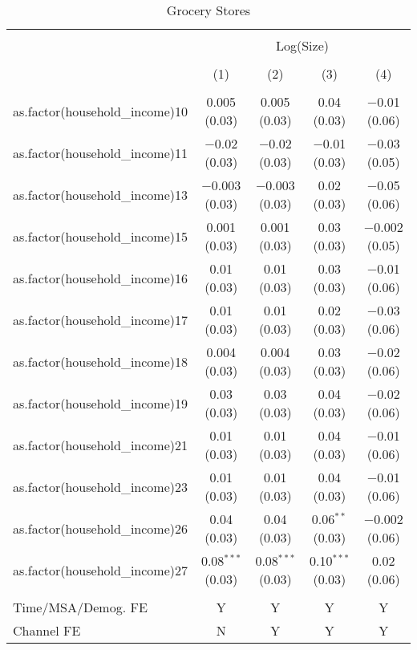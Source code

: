
\begin{table}[!htbp] \centering 
  \caption{Grocery Stores} 
  \label{tab:packageSizeGroceryTamponappendix} 
\begin{tabular}{@{\extracolsep{5pt}}lcccc} 
\\[-1.8ex]\hline 
\hline \\[-1.8ex] 
 & \multicolumn{4}{c}{Log(Size)} \\ 
\\[-1.8ex] & (1) & (2) & (3) & (4)\\ 
\hline \\[-1.8ex] 
 as.factor(household\_income)10 & 0.005 (0.03) & 0.005 (0.03) & 0.04 (0.03) & $-$0.01 (0.06) \\ 
  as.factor(household\_income)11 & $-$0.02 (0.03) & $-$0.02 (0.03) & $-$0.01 (0.03) & $-$0.03 (0.05) \\ 
  as.factor(household\_income)13 & $-$0.003 (0.03) & $-$0.003 (0.03) & 0.02 (0.03) & $-$0.05 (0.06) \\ 
  as.factor(household\_income)15 & 0.001 (0.03) & 0.001 (0.03) & 0.03 (0.03) & $-$0.002 (0.05) \\ 
  as.factor(household\_income)16 & 0.01 (0.03) & 0.01 (0.03) & 0.03 (0.03) & $-$0.01 (0.06) \\ 
  as.factor(household\_income)17 & 0.01 (0.03) & 0.01 (0.03) & 0.02 (0.03) & $-$0.03 (0.06) \\ 
  as.factor(household\_income)18 & 0.004 (0.03) & 0.004 (0.03) & 0.03 (0.03) & $-$0.02 (0.06) \\ 
  as.factor(household\_income)19 & 0.03 (0.03) & 0.03 (0.03) & 0.04 (0.03) & $-$0.02 (0.06) \\ 
  as.factor(household\_income)21 & 0.01 (0.03) & 0.01 (0.03) & 0.04 (0.03) & $-$0.01 (0.06) \\ 
  as.factor(household\_income)23 & 0.01 (0.03) & 0.01 (0.03) & 0.04 (0.03) & $-$0.01 (0.06) \\ 
  as.factor(household\_income)26 & 0.04 (0.03) & 0.04 (0.03) & 0.06$^{**}$ (0.03) & $-$0.002 (0.06) \\ 
  as.factor(household\_income)27 & 0.08$^{***}$ (0.03) & 0.08$^{***}$ (0.03) & 0.10$^{***}$ (0.03) & 0.02 (0.06) \\ 
 \hline \\[-1.8ex] 
Time/MSA/Demog. FE & Y & Y & Y & Y \\ 
Channel FE & N & Y & Y & Y \\ 

\end{tabular}
\end{table}
